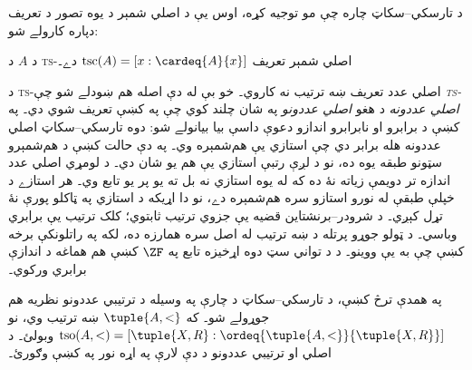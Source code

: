 \documentclass[../../../include/open-logic-section]{subfiles}
\begin{document}
د تارسکي--سکاټ چاره چې مو توجيه کړه، اوس يې د
اصلي شمېر د يوه تصور د تعريف دپاره کارولے شو:

\begin{defn}
د $A$ د \textsc{ts}-اصلي شمېر تعريف
$\text{tsc}(A) = [x :
\cardeq{A}{x}]$ دے۔
\end{defn}

د \textsc{ts}-اصلي عدد تعريف ښه ترتيب نه کاروي۔
خو بې له دې اصله هم ښودلے شو چې
\emph{\textsc{ts}-اصلي عددونه} د هغو
\emph{اصلي عددونو} په شان چلند کوي چې په
کښې تعريف شوي دي۔ په
کښې د برابرو او نابرابرو اندازو دعوې داسې بيا بيانولے
شو: دوه تارسکي--سکاټ اصلي عددونه هله برابر دي چې
استازي يې هم‌شمېره وي۔ په دې حالت کښې د هم‌شمېرو
سټونو طبقه يوه ده، نو د لږې رتبې استازي يې هم يو شان
دي۔ د لومړي اصلي عدد اندازه تر دويمې زياته نۀ ده که
له يوه استازي نه بل ته يو پر يو تابع وي۔ هر استازے
د خپلې طبقې له نورو استازو سره هم‌شمېره دے، نو دا
اړيکه د استازي په ټاکلو پورې نۀ تړل کېږي۔ د
شرودر--برنشتاين قضيه يې جزوي ترتيب ثابتوي؛ کلک
ترتيب يې برابري وباسي۔ د ټولو جوړو پرتله د ښه
ترتيب له اصل سره همارزه ده، لکه په راتلونکې برخه
کښې چې به يې ووينو۔ د
د تواني سټ دوه اړخيزه تابع په $\ZF$ کښې هم
هماغه د اندازې برابري ورکوي۔

په همدې ترڅ کښې، د تارسکي--سکاټ د چارې په وسيله
د ترتيبي عددونو نظريه هم جوړولے شو۔ که
$\tuple{A, <}$ ښه ترتيب وي، نو
$\text{tso}(A, <) = [\tuple{X,
R} : \ordeq{\tuple{A, <}}{\tuple{X, R}}]$
وبولئ۔ د اصلي او ترتيبي عددونو د دې لارې په اړه
نور په \citet[chs.~9--12]{Potter2004} کښې وګورئ۔
\end{document}

